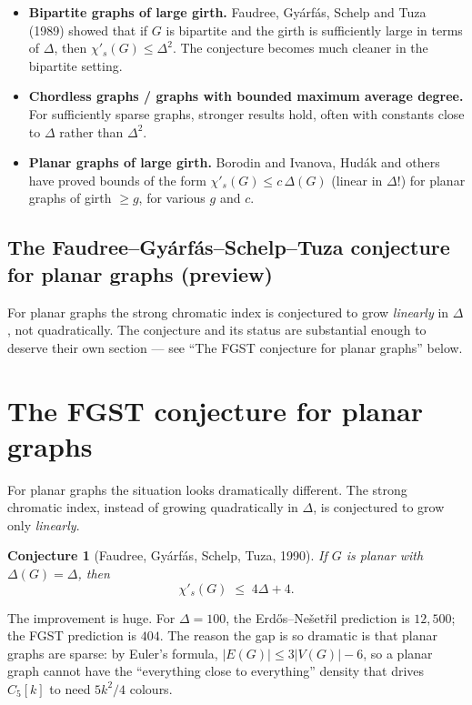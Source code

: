 \documentclass[11pt]{article}
\newcommand{\sci}{\chi'_s}
\newtheorem*{conjecture*}{Conjecture}
\begin{document}
\begin{itemize}[leftmargin=*, itemsep=2pt]
  \item \textbf{Bipartite graphs of large girth.} Faudree, Gy\'arf\'as,
        Schelp and Tuza (1989) showed that if $G$ is bipartite and
        the girth is sufficiently large in terms of $\Delta$, then
        $\sci(G) \leq \Delta^2$. The conjecture becomes much
        cleaner in the bipartite setting.
  \item \textbf{Chordless graphs / graphs with bounded maximum
        average degree.} For sufficiently sparse graphs, stronger
        results hold, often with constants close to $\Delta$
        rather than $\Delta^2$.
  \item \textbf{Planar graphs of large girth.} Borodin and Ivanova,
        Hud\'ak and others have proved bounds of the form
        $\sci(G) \leq c\,\Delta(G)$ (linear in $\Delta$!) for
        planar graphs of girth $\geq g$, for various $g$ and $c$.
\end{itemize}

\subsection*{The Faudree--Gy\'arf\'as--Schelp--Tuza conjecture for
planar graphs (preview)}

For planar graphs the strong chromatic index is conjectured to grow
\emph{linearly} in $\Delta$, not quadratically. The conjecture and its
status are substantial enough to deserve their own section --- see
``The FGST conjecture for planar graphs'' below.

\section*{The FGST conjecture for planar graphs}

For planar graphs the situation looks dramatically different. The
strong chromatic index, instead of growing quadratically in $\Delta$,
is conjectured to grow only \emph{linearly}.

\begin{conjecture*}[Faudree, Gy\'arf\'as, Schelp, Tuza, 1990]
If $G$ is planar with $\Delta(G) = \Delta$, then
\[
\sci(G) \;\leq\; 4\Delta + 4 .
\]
\end{conjecture*}

The improvement is huge. For $\Delta = 100$, the Erd\H{o}s--Ne\v{s}et\v{r}il
prediction is $12{,}500$; the FGST prediction is $404$. The reason
the gap is so dramatic is that planar graphs are sparse: by Euler's
formula, $|E(G)| \leq 3|V(G)| - 6$, so a planar graph cannot have the
``everything close to everything'' density that drives $C_5[k]$ to
need $5k^2/4$ colours.
\end{document}
